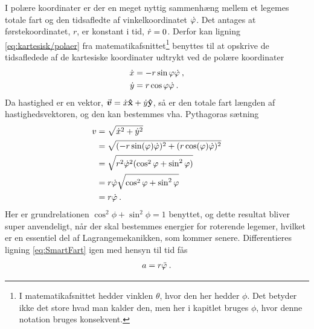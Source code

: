 I polære koordinater er der en meget nyttig sammenhæng mellem et legemes totale fart og den tidsafledte af vinkelkoordinatet $\dot{\varphi}$. Det antages at førstekoordinatet, $r$, er konstant i tid, $\dot{r} = 0$. Derfor kan ligning \eqref{eq:kartesisk/polaer} fra matematikafsnittet\footnote{I matematikafsnittet hedder vinklen $\theta$, hvor den her hedder $\phi$. Det betyder ikke det store hvad man kalder den, men her i kapitlet bruges $\phi$, hvor denne notation bruges konsekvent.} benyttes til at opskrive de tidsafledede af de kartesiske koordinater udtrykt ved de polære koordinater
%
\begin{equation}
\begin{aligned}
	\dot{x} &= -r\sin\varphi\dot{\varphi} \: , \\
	\dot{y} &= r\cos\varphi\dot{\varphi} \: .
\end{aligned}
\end{equation}
%
Da hastighed er en vektor, ${\vec{\boldsymbol{v}}} = \dot{x} \mathbf{\hat{x}} + \dot{y} \mathbf{\hat{y}}$, så er den totale fart længden af hastighedsvektoren, og den kan bestemmes vha. Pythagoras sætning
%
\begin{equation} \label{eq:SmartFart}
\begin{aligned}
	v &= \sqrt{\dot{x}^2 + \dot{y}^2} \\
	&= \sqrt{(-r\sin(\varphi)\dot{\varphi})^2 + (r\cos(\varphi)\dot{\varphi})^2} \\
	&= \sqrt{r^2\dot{\varphi}^2(\cos^2\varphi + \sin^2\varphi)} \\
	&= r\dot{\varphi}\sqrt{\cos^2\varphi + \sin^2\varphi} \\
	&= r\dot{\varphi} \: .
\end{aligned}
\end{equation}
%
Her er grundrelationen $\cos^2\phi + \sin^2\phi = 1$ benyttet, og dette resultat bliver super anvendeligt, når der skal bestemmes energier for roterende legemer, hvilket er en essentiel del af Lagrangemekanikken, som kommer senere. Differentieres ligning \eqref{eq:SmartFart} igen med hensyn til tid fås
\begin{align}
	a = r\ddot{\varphi} \: .
\end{align}

